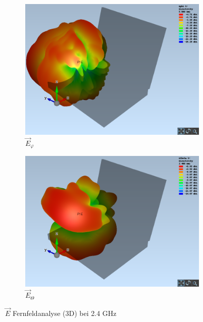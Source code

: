 \begin{figure}[h!]
	\begin{subfigure}[b]{0.48\textwidth}
		\includegraphics[width=1\textwidth]{../fig/plt/crazy_stuff_l4_pcb_v2c_laptop_1a_105_2ghz4_3d_farfield_ephi_xyz.png}
		\caption{$\vec{E}_{\varphi}$}
	\end{subfigure}
	\begin{subfigure}[b]{0.48\textwidth}
		\includegraphics[width=1\textwidth]{../fig/plt/crazy_stuff_l4_pcb_v2c_laptop_1a_105_2ghz4_3d_farfield_etheta_xyz.png}
		\caption{$\vec{E}_{\Theta}$}
	\end{subfigure}
	\caption{$\vec{E}$ Fernfeldanalyse (3D) bei 2.4 GHz}
\end{figure}

